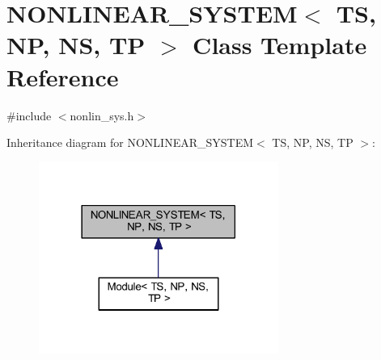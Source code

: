 \hypertarget{class_n_o_n_l_i_n_e_a_r___s_y_s_t_e_m}{}\section{N\+O\+N\+L\+I\+N\+E\+A\+R\+\_\+\+S\+Y\+S\+T\+EM$<$ TS, NP, NS, TP $>$ Class Template Reference}
\label{class_n_o_n_l_i_n_e_a_r___s_y_s_t_e_m}


{\ttfamily \#include $<$nonlin\+\_\+sys.\+h$>$}



Inheritance diagram for N\+O\+N\+L\+I\+N\+E\+A\+R\+\_\+\+S\+Y\+S\+T\+EM$<$ TS, NP, NS, TP $>$\+:
\nopagebreak
\begin{figure}[H]
\begin{center}
\leavevmode
\includegraphics[width=222pt]{class_n_o_n_l_i_n_e_a_r___s_y_s_t_e_m__inherit__graph}
\end{center}
\end{figure}
